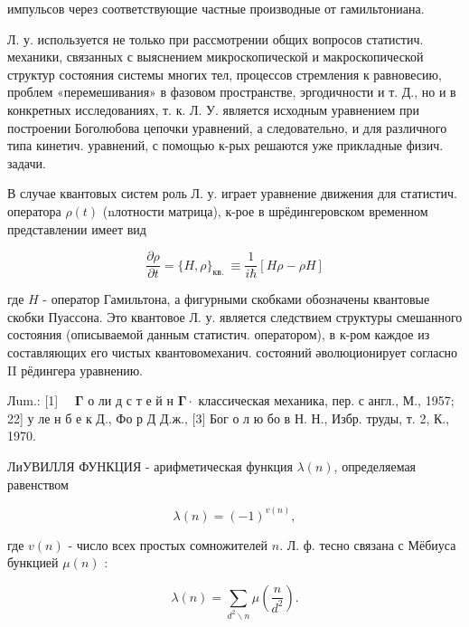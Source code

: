 \documentclass[10pt]{article}
\begin{document}
импульсов через соответствующие частные производные от гамильтониана.



Л. у. используется не только при рассмотрении общих вопросов статистич. механики, связанных с выяснением микроскопической и макроскопической структур состояния системы многих тел, процессов стремления к равновесию, проблем «перемешивания» в фазовом пространстве, эргодичности и т. Д., но и в конкретных исследованиях, т. к. Л. У. является исходным уравнением при построении Боголюбова цепочки уравнений, а следовательно, и для различного типа кинетич. уравнений, с помощью к-рых решаются уже прикладные физич. задачи.



В случае квантовых систем роль Л. у. играет уравнение движения для статистич. оператора $\rho(t)$ (nлотности матрица), к-рое в шрёдингеровском временном представлении имеет вид



\[

\frac{\partial \rho}{\partial t}=\{H, \rho\}_{\text {кв. }} \equiv \frac{1}{i \hbar}[H \rho-\rho H]

\]



где $H$ - оператор Гамильтона, а фигурными скобками обозначены квантовые скобки Пуассона. Это квантовое Л. у. является следствием структуры смешанного состояния (описываемой данным статистич. оператором), в к-ром каждое из составляющих его чистых квантовомеханич. состояний әволюционирует согласно II рёдингера уравнению.



Лum.: [1] $\quad \boldsymbol{\Gamma}$ о ли д с т е й н $\boldsymbol{\Gamma} \cdot$ классическая механика, пер. с англ., М., 1957; 22] у ле н б е к Д., Фо р Д Д.ж., [3] Бог о л ю бо в Н. Н., Избр. труды, т. 2, К., 1970.



ЛиУВИЛЛЯ ФУНКЦИЯ - арифметическая функция $\lambda(n)$, определяемая равенством



\[

\lambda(n)=(-1)^{v(n)},

\]



где $v(n)$ - число всех простых сомножителей $n$. Л. ф. тесно связана с Мёбиуса бункцией $\mu(n)$ :



\[

\lambda(n)=\sum_{d^{2} \backslash n} \mu\left(\frac{n}{d^{2}}\right) .

\]
\end{document}
